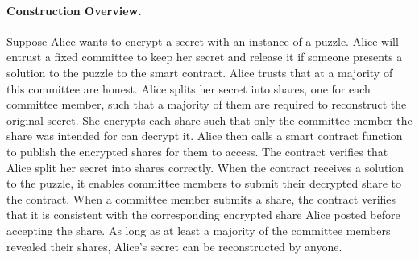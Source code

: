 \paragraph{Construction Overview.}
Suppose Alice wants to encrypt a secret with an instance of a puzzle.
Alice will entrust a fixed committee to keep her secret and release it if someone presents a solution to the puzzle to the smart contract.
Alice trusts that at a majority of this committee are honest.
Alice splits her secret into shares, one for each committee member, such that a majority of them are required to reconstruct the original secret.
She encrypts each share such that only the committee member the share was intended for can decrypt it.
Alice then calls a smart contract function to publish the encrypted shares for them to access.
The contract verifies that Alice split her secret into shares correctly.
When the contract receives a solution to the puzzle, it enables committee members to submit their decrypted share to the contract.
When a committee member submits a share, the contract verifies that it is consistent with the corresponding encrypted share Alice posted before accepting the share.
As long as at least a majority of the committee members revealed their shares, Alice's secret can be reconstructed by anyone.